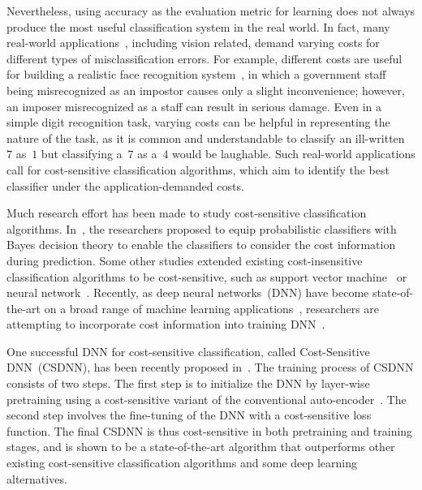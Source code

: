 \documentclass[a4paper]{article}
\begin{document}
  Nevertheless, using accuracy as the evaluation metric for learning does not always produce the most useful classification system in the real world.
  In fact, many real-world applications~\cite{tan1993cost,chan1998toward,fan2000multiple,zhang2010cost,TJ2011}, including vision related, demand varying costs for different types of misclassification errors.
  For example, different costs are useful for building a realistic face recognition system~\cite{zhang2010cost,lu2010cost,zhang2014cost,zhang2016cost}, in which a government staff being misrecognized as an impostor causes only a slight inconvenience; however, an imposer misrecognized as a staff can result in serious damage.
  Even in a simple digit recognition task, varying costs can be helpful in representing the nature of the task, as it is common and understandable to classify an ill-written~$7$ as~$1$ but classifying a~$7$ as a~$4$ would be laughable.
  Such real-world applications call for cost-sensitive classification algorithms, which aim to identify the best classifier under the application-demanded costs.

  Much research effort has been made to study cost-sensitive classification algorithms.
  In~\cite{kukar1998cost,domingos1999metacost,zadrozny2001learning}, the researchers proposed to equip probabilistic classifiers with Bayes decision theory to enable the classifiers to consider the cost information during prediction.
  Some other studies extended existing cost-insensitive classification algorithms to be cost-sensitive, such as support vector machine~\cite{HT2010} or neural network~\cite{kukar1998cost,zhou2006training}.
  Recently, as deep neural networks~(DNN) have become state-of-the-art on a broad range of machine learning applications~\cite{dahl2012context,hinton2012deep,simonyan2014very,szegedy2015going,he2015deep}, researchers are attempting to incorporate cost information into training DNN~\cite{YC2016}.

  One successful DNN for cost-sensitive classification, called Cost-Sensitive DNN~(CSDNN), has been recently proposed in~\cite{YC2016}.
  The training process of CSDNN consists of two steps.
  The first step is to initialize the DNN by layer-wise pretraining using a cost-sensitive variant of the conventional auto-encoder~\cite{bengio2009learning}.
  The second step involves the fine-tuning of the DNN with a cost-sensitive loss function.
  The final CSDNN is thus cost-sensitive in both pretraining and training stages, and is shown to be a state-of-the-art algorithm that outperforms other existing cost-sensitive classification algorithms and some deep learning alternatives.
 
\end{document}
